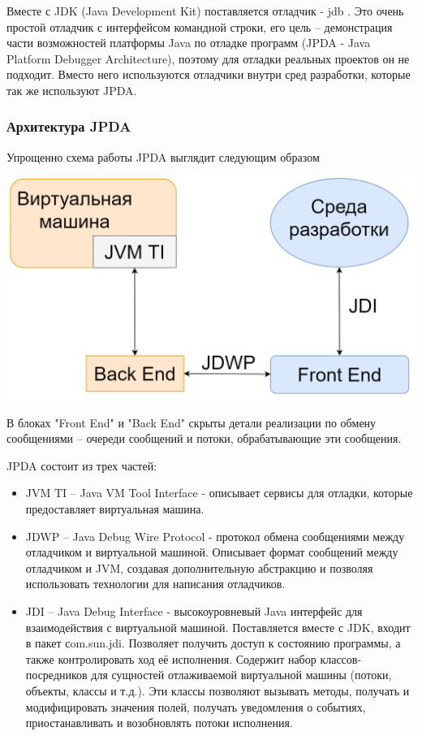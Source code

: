 Вместе с JDK (Java Development Kit) поставляется отладчик - jdb \cite{debug:jdb}. Это очень простой отладчик с интерфейсом командной строки, его цель -- демонстрация части возможностей платформы Java по отладке программ (JPDA - Java Platform Debugger Architecture), поэтому для отладки реальных проектов он не подходит. Вместо него используются отладчики внутри сред разработки, которые так же используют JPDA.

\subsubsection{Архитектура JPDA}\label{jdpa}
Упрощенно схема работы JPDA выглядит следующим образом

\vspace{1em}
\includegraphics[scale=0.4]{chapter1/img/jdpa.png}

В блоках "Front End" и "Back End" скрыты детали реализации по обмену сообщениями -- очереди сообщений и потоки, обрабатывающие эти сообщения.

JPDA состоит из трех частей:
\begin{itemize}
	\item JVM TI -- Java VM Tool Interface - описывает сервисы для отладки, которые предоставляет виртуальная машина.
	\item JDWP -- Java Debug Wire Protocol - протокол обмена сообщениями между отладчиком и виртуальной машиной. Описывает формат сообщений между отладчиком и JVM, создавая дополнительную абстракцию и позволяя использовать технологии для написания отладчиков.
	\item JDI -- Java Debug Interface - высокоуровневый Java интерфейс для взаимодействия с виртуальной машиной. Поставляется вместе с JDK, входит в пакет сom.sun.jdi. Позволяет получить доступ к состоянию программы, а также контролировать ход её исполнения. Содержит набор классов-посредников для сущностей отлаживаемой виртуальной машины (потоки, объекты, классы и т.д.). Эти классы позволяют вызывать методы, получать и модифицировать значения полей, получать уведомления о событиях, приостанавливать и возобновлять потоки исполнения.
\end{itemize}



